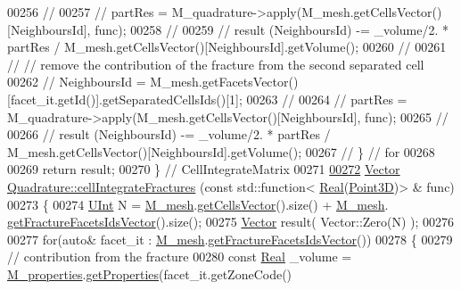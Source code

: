 \begin{DoxyCode}
00256 \textcolor{comment}{//}
00257 \textcolor{comment}{//        partRes = M\_quadrature->apply(M\_mesh.getCellsVector()[NeighboursId], func);}
00258 \textcolor{comment}{//}
00259 \textcolor{comment}{//        result (NeighboursId) -= \_volume/2. * partRes /
       M\_mesh.getCellsVector()[NeighboursId].getVolume();}
00260 \textcolor{comment}{//}
00261 \textcolor{comment}{//        // remove the contribution of the fracture from the second separated cell}
00262 \textcolor{comment}{//        NeighboursId = M\_mesh.getFacetsVector()[facet\_it.getId()].getSeparatedCellsIds()[1];}
00263 \textcolor{comment}{//}
00264 \textcolor{comment}{//        partRes = M\_quadrature->apply(M\_mesh.getCellsVector()[NeighboursId], func);}
00265 \textcolor{comment}{//}
00266 \textcolor{comment}{//        result (NeighboursId) -= \_volume/2. * partRes /
       M\_mesh.getCellsVector()[NeighboursId].getVolume();}
00267 \textcolor{comment}{//    \} // for}
00268 
00269     \textcolor{keywordflow}{return} result;
00270 \} \textcolor{comment}{// CellIntegrateMatrix}
00271 
\hypertarget{Quadrature_8cpp_source.tex_l00272}{}\hyperlink{classFVCode3D_1_1Quadrature_a2c3240f24eed6f871394ca3eafbffc78}{00272} \hyperlink{namespaceFVCode3D_a16ccf345652402bccd1a5d2e6782526c}{Vector} \hyperlink{classFVCode3D_1_1Quadrature_a2c3240f24eed6f871394ca3eafbffc78}{Quadrature::cellIntegrateFractures} (\textcolor{keyword}{const} std::function<
      \hyperlink{namespaceFVCode3D_a40c1f5588a248569d80aa5f867080e83}{Real}(\hyperlink{classFVCode3D_1_1Point3D}{Point3D})> & func)
00273 \{
00274     \hyperlink{namespaceFVCode3D_a4bf7e328c75d0fd504050d040ebe9eda}{UInt} N = \hyperlink{classFVCode3D_1_1Quadrature_abaa2519ea32065df30242bd5f5cb2d01}{M\_mesh}.\hyperlink{classFVCode3D_1_1Rigid__Mesh_afefb62f2c37317402b495e2369ed495b}{getCellsVector}().size() + \hyperlink{classFVCode3D_1_1Quadrature_abaa2519ea32065df30242bd5f5cb2d01}{M\_mesh}.
      \hyperlink{classFVCode3D_1_1Rigid__Mesh_aadbe6d9ad704122537903396d91238e0}{getFractureFacetsIdsVector}().size();
00275     \hyperlink{namespaceFVCode3D_a16ccf345652402bccd1a5d2e6782526c}{Vector} result( Vector::Zero(N) );
00276 
00277     \textcolor{keywordflow}{for}(\textcolor{keyword}{auto}& facet\_it : \hyperlink{classFVCode3D_1_1Quadrature_abaa2519ea32065df30242bd5f5cb2d01}{M\_mesh}.\hyperlink{classFVCode3D_1_1Rigid__Mesh_aadbe6d9ad704122537903396d91238e0}{getFractureFacetsIdsVector}())
00278     \{
00279         \textcolor{comment}{// contribution from the fracture}
00280         \textcolor{keyword}{const} \hyperlink{namespaceFVCode3D_a40c1f5588a248569d80aa5f867080e83}{Real} \_volume = \hyperlink{classFVCode3D_1_1Quadrature_ace6cd23087209d3186ae173c265cde39}{M\_properties}.\hyperlink{classFVCode3D_1_1PropertiesMap_ace888d15c9a4ab13d5e217a3a565604c}{getProperties}(facet\_it.getZoneCode()

\end{DoxyCode}
